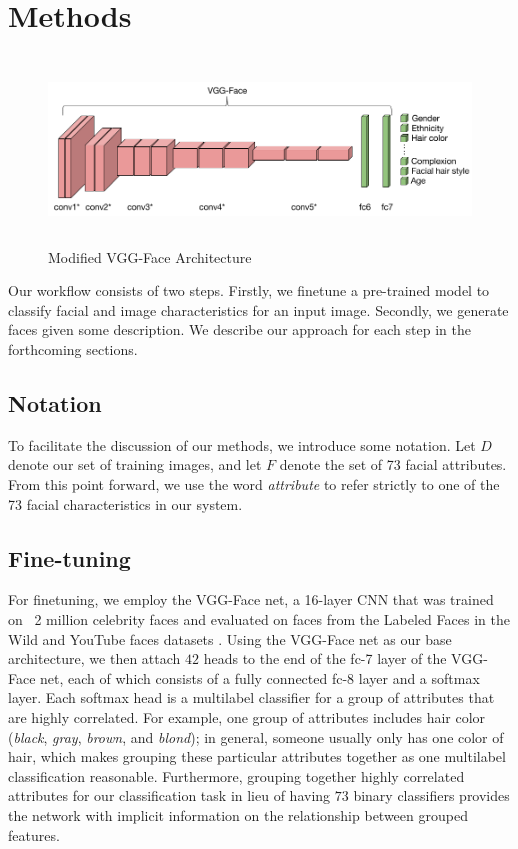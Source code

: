 \documentclass[10pt,twocolumn,letterpaper]{article}
\begin{document}
\section{Methods}
\begin{figure}
  \includegraphics[width=\textwidth,height=5cm]{images/arch.png}
  \caption{Modified VGG-Face Architecture}
  \label{fig:arch}
\end{figure}
Our workflow consists of two steps. Firstly, we finetune a pre-trained model to classify facial and image characteristics for an input image. Secondly, we generate faces given some description. We describe our approach for each step in the forthcoming sections.

\subsection{Notation}
To facilitate the discussion of our methods, we introduce some notation. Let $D$ denote our set of training images, and let $F$ denote the set of 73 facial attributes.
From this point forward, we use the word \textit{attribute} to refer strictly to one of the 73 facial characteristics in our system.

\subsection{Fine-tuning}\label{sec:finetuningmethod}
For finetuning, we employ the VGG-Face net, a 16-layer CNN that was trained on ~2 million celebrity faces and evaluated on faces from the Labeled Faces in the Wild and YouTube faces datasets \cite{vggfacenet}. Using the VGG-Face net as our base architecture, we then attach $42$ heads to the end of the fc-7 layer of the VGG-Face net, each of which consists of a fully connected fc-8 layer and a softmax layer. Each softmax head is a multilabel classifier for a group of attributes that are highly correlated. For example, one group of attributes includes hair color (\textit{black}, \textit{gray}, \textit{brown}, and \textit{blond}); in general, someone usually only has one color of hair, which makes grouping these particular attributes together as one multilabel classification reasonable. Furthermore, grouping together highly correlated attributes for our classification task in lieu of having $73$ binary classifiers provides the network with implicit information on the relationship between grouped features.
\end{document}
